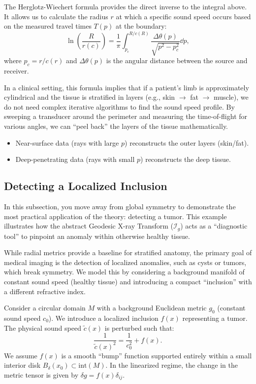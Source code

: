 The Herglotz-Wiechert formula provides the direct inverse to the integral above. It allows us to calculate the radius $r$ at which a specific sound speed occurs based on the measured travel times $T(p)$ at the boundary:
\[%
  \ln\left( \frac{R}{r(c)} \right) = \frac{1}{\pi} \int_{p_c}^{R/c(R)} \frac{\Delta\theta(p)}{\sqrt{p^2 - p_c^2}} \dd{p}
,\]%
where $p_c = r/c(r)$ and $\Delta\theta(p)$ is the angular distance between the source and receiver.

In a clinical setting, this formula implies that if a patient's limb is approximately cylindrical and the tissue is stratified in layers (e.g., skin $\to$ fat $\to$ muscle), we do not need complex iterative algorithms to find the sound speed profile. By sweeping a transducer around the perimeter and measuring the time-of-flight for various angles, we can ``peel back'' the layers of the tissue mathematically.
\begin{itemize}
  \item Near-surface data (rays with large $p$) reconstructs the outer layers (skin/fat).
  \item Deep-penetrating data (rays with small $p$) reconstructs the deep tissue.
\end{itemize}

\subsection{Detecting a Localized Inclusion}

In this subsection, you move away from global symmetry to demonstrate the most practical application of the theory: detecting a tumor. This example illustrates how the abstract Geodesic X-ray Transform ($\mathcal{I}_g$) acts as a ``diagnostic tool'' to pinpoint an anomaly within otherwise healthy tissue.

While radial metrics provide a baseline for stratified anatomy, the primary goal of medical imaging is the detection of localized anomalies, such as cysts or tumors, which break symmetry. We model this by considering a background manifold of constant sound speed (healthy tissue) and introducing a compact ``inclusion'' with a different refractive index.

Consider a circular domain $M$ with a background Euclidean metric $g_0$ (constant sound speed $c_0$). We introduce a localized inclusion $f(x)$ representing a tumor. The physical sound speed $\tilde{c}(x)$ is perturbed such that:
\[%
  \frac{1}{\tilde{c}(x)^2} = \frac{1}{c_0^2} + f(x)
.\]%
We assume $f(x)$ is a smooth ``bump'' function supported entirely within a small interior disk $B_\delta(x_0) \subset \text{int}(M)$. In the linearized regime, the change in the metric tensor is given by $\delta g = f(x)\delta_{ij}$.

